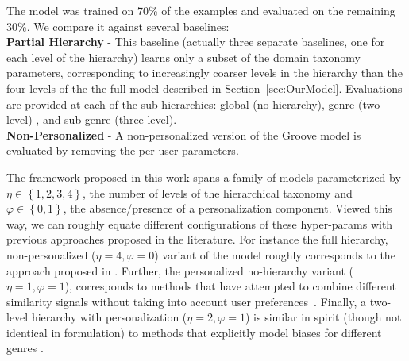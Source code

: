 
The model was trained on 70\% of the examples and evaluated on the remaining 30\%. 
We compare it against several baselines:\\
{\bf Partial Hierarchy} - This baseline (actually three separate baselines, one for each level of the hierarchy)  learns only a subset of the domain taxonomy parameters, corresponding to increasingly coarser levels in the hierarchy than the four levels of the the full model described in Section~\ref{sec:OurModel}. Evaluations are provided at each of the sub-hierarchies: global (no hierarchy), genre (two-level) , and sub-genre (three-level).\\
{\bf Non-Personalized} - A non-personalized version of the Groove model is evaluated by removing the per-user parameters.%

 The framework proposed in this work spans a family of models parameterized by $\eta\in\left\{1,2,3,4\right\}$, the number of levels of the hierarchical taxonomy and $\varphi\in\left\{0,1\right\}$, the absence/presence of a personalization component. Viewed this way, we can roughly equate different configurations of these hyper-params with previous approaches proposed in the literature. For instance the full hierarchy, non-personalized ($\eta=4,\varphi=0$) variant of the model roughly corresponds to the approach proposed in \cite{NIPS2012_4609}. Further, the personalized no-hierarchy variant ($\eta=1,\varphi=1$), corresponds to methods that have attempted to combine different similarity signals without taking into account user preferences~\cite{Knees:2006,McFee_multi_similarities}. Finally, a two-level hierarchy with personalization  ($\eta=2,\varphi=1$) is similar in spirit (though not identical in formulation) to methods that explicitly model biases for different genres \cite{Dror2011,Mnih2012}.

